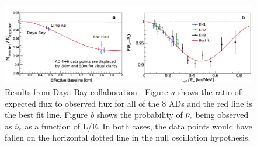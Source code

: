 \documentclass[11pt]{article}
\newcommand{\nuebar}{\ensuremath{\overline{\nu }_{e}} \hspace{1pt}}
\numberwithin{equation}{section}
\begin{document}
 \begin{figure}[h]
\centering
  \includegraphics[width=\textwidth]{./Dayabay_Results.PNG}
\caption[Daya Bay results]{Results from Daya Bay collaboration \cite{an2013improved}. Figure \textit{a} shows the ratio of expected flux to observed flux for all of the 8 ADs and the red line is the best fit line. Figure \textit{b} shows the probability of \nuebar being observed as \nuebar as a function of L/E. In both cases, the data points would have fallen on the horizontal dotted line in the null oscillation hypothesis.  }
\label{fig:dayabay_results}
\end{figure}
\end{document}
